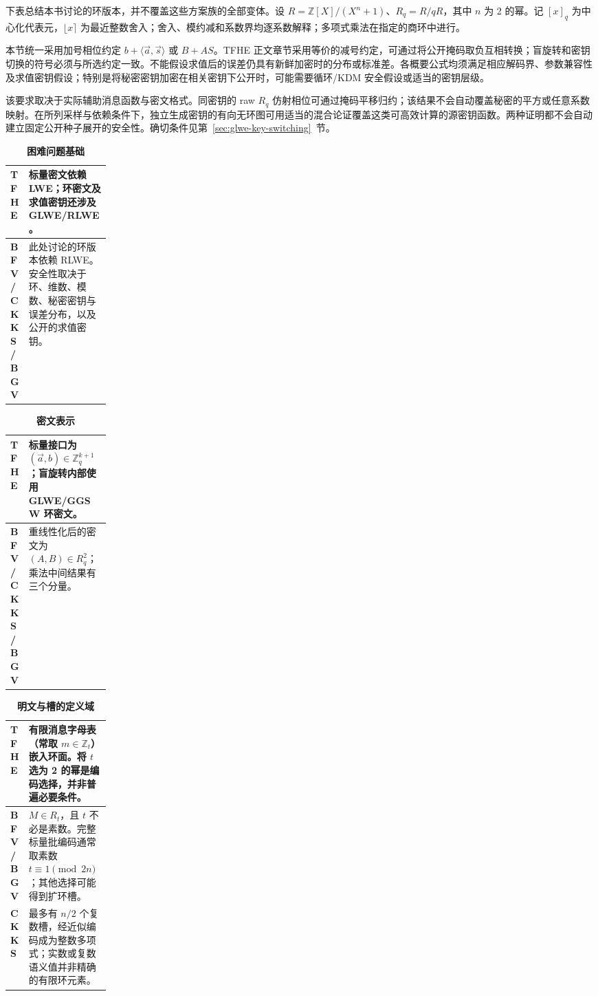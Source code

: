 下表总结本书讨论的环版本，并不覆盖这些方案族的全部变体。设 $R=\mathbb Z[X]/(X^n+1)$、$R_q=R/qR$，其中 $n$ 为 2 的幂。记 $[x]_q$ 为中心化代表元，$\lfloor x\rceil$ 为最近整数舍入；舍入、模约减和系数界均逐系数解释；多项式乘法在指定的商环中进行。

本节统一采用加号相位约定 $b+\langle\vec a,\vec s\rangle$ 或 $B+AS$。TFHE 正文章节采用等价的减号约定，可通过将公开掩码取负互相转换；盲旋转和密钥切换的符号必须与所选约定一致。不能假设求值后的误差仍具有新鲜加密时的分布或标准差。各概要公式均须满足相应解码界、参数兼容性及求值密钥假设；特别是将秘密密钥加密在相关密钥下公开时，可能需要循环/KDM 安全假设或适当的密钥层级。

该要求取决于实际辅助消息函数与密文格式。同密钥的 raw $R_q$ 仿射相位可通过掩码平移归约；该结果不会自动覆盖秘密的平方或任意系数映射。在所列采样与依赖条件下，独立生成密钥的有向无环图可用适当的混合论证覆盖这类可高效计算的源密钥函数。两种证明都不会自动建立固定公开种子展开的安全性。确切条件见第~\ref{sec:glwe-key-switching}~节。

\captionsetup{justification=raggedright,singlelinecheck=false,labelfont=bf}


\begin{table}[htbp]
\small
\renewcommand{\arraystretch}{1.15}
\begin{tabularx}{\linewidth}{|p{0.17\linewidth}|X|}
\hline
\textbf{TFHE}&标量密文依赖 LWE；环密文及求值密钥还涉及 GLWE/RLWE。\\\hline
\textbf{BFV / CKKS / BGV}&此处讨论的环版本依赖 RLWE。安全性取决于环、维数、模数、秘密密钥与误差分布，以及公开的求值密钥。\\\hline
\end{tabularx}
\caption{\textbf{困难问题基础}}
\end{table}

\begin{table}[htbp]
\small
\renewcommand{\arraystretch}{1.15}
\begin{tabularx}{\linewidth}{|p{0.17\linewidth}|X|}
\hline
\textbf{TFHE}&标量接口为 $(\vec a,b)\in\mathbb Z_q^{k+1}$；盲旋转内部使用 GLWE/GGSW 环密文。\\\hline
\textbf{BFV / CKKS / BGV}&重线性化后的密文为 $(A,B)\in R_q^2$；乘法中间结果有三个分量。\\\hline
\end{tabularx}
\caption{\textbf{密文表示}}
\end{table}

\begin{table}[htbp]
\small
\renewcommand{\arraystretch}{1.15}
\begin{tabularx}{\linewidth}{|p{0.17\linewidth}|X|}
\hline
\textbf{TFHE}&有限消息字母表（常取 $m\in\mathbb Z_t$）嵌入环面。将 $t$ 选为 2 的幂是编码选择，并非普遍必要条件。\\\hline
\textbf{BFV / BGV}&$M\in R_t$，且 $t$ 不必是素数。完整标量批编码通常取素数 $t\equiv1\pmod{2n}$；其他选择可能得到扩环槽。\\\hline
\textbf{CKKS}&最多有 $n/2$ 个复数槽，经近似编码成为整数多项式；实数或复数语义值并非精确的有限环元素。\\\hline
\end{tabularx}
\caption{\textbf{明文与槽的定义域}}
\end{table}

